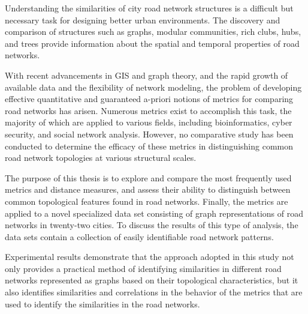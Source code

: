 
Understanding the similarities of city road network structures is a difficult but necessary task for designing better urban environments. The discovery and comparison of structures such as graphs, modular communities, rich clubs, hubs, and trees provide information about the spatial and temporal properties of road networks.

With recent advancements in GIS and graph theory, and the rapid growth of available data and the flexibility of network modeling, the problem of developing effective quantitative and guaranteed a-priori notions of metrics for comparing road networks has arisen. Numerous metrics exist to accomplish this task, the majority of which are applied to various fields, including bioinformatics, cyber security, and social network analysis. However, no comparative study has been conducted to determine the efficacy of these metrics in distinguishing common road network topologies at various structural scales.

The purpose of this thesis is to explore and compare the most frequently used metrics and distance measures, and assess their ability to distinguish between common topological features found in road networks. Finally, the metrics are applied to a novel specialized data set consisting of graph representations of road networks in twenty-two cities. To discuss the results of this type of analysis, the data sets contain a collection of easily identifiable road network patterns.

Experimental results demonstrate that the approach adopted in this study not only provides a practical method of identifying similarities in different road networks represented as graphs based on their topological characteristics, but it also identifies similarities and correlations in the behavior of the metrics that are used to identify the similarities in the road networks.

